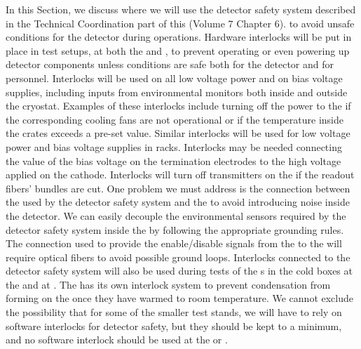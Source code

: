 In this Section, we discuss where we will use
the detector safety system described in the Technical
Coordination part of this  (Volume 7 Chapter 6). %
to avoid unsafe conditions for the  detector 
during operations. Hardware interlocks will be put in place
in test setups, at both the  and , to prevent operating or even powering up
detector components 
unless conditions are safe
both for the detector and for personnel. Interlocks will be
used on all low voltage power and on bias voltage 
supplies, including inputs from environmental monitors both
inside and outside the cryostat. Examples of these interlocks include turning off the power to the 
if the corresponding cooling fans are not operational or
if the temperature inside the crates exceeds a pre-set value.
Similar interlocks will be used for low voltage power
and bias voltage supplies in  racks.
Interlocks may be needed connecting the value of the 
bias voltage on the  termination electrodes to the
high voltage applied on the  cathode. Interlocks will turn 
off transmitters on the  if the readout fibers'
bundles are cut. One problem we must address is 
the connection between the  used by the detector 
safety system and the  to avoid introducing noise 
inside the detector. We can easily decouple the environmental 
sensors required by the detector safety system inside the 
 by following the appropriate grounding rules. 
The connection used to provide the enable/disable signals 
from the  to the  will require optical 
fibers to avoid possible ground loops. Interlocks connected
to the detector safety system will also be used during tests 
of the s in the cold boxes at the  and 
at . The  has its own interlock system to
prevent condensation from forming on the  once
they have warmed to room temperature. We cannot exclude the possibility that for some of the smaller test stands, we will 
have to rely on software interlocks for detector safety,
but they should be kept to a minimum, and no software
interlock should be used at the  or .
